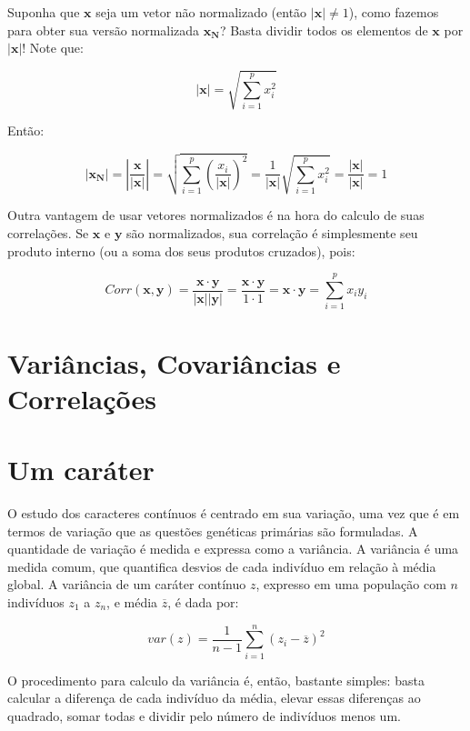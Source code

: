 \documentclass[portuges,]{tufte-handout}
\begin{document}
Suponha que $\mathbf{x}$ seja um vetor não normalizado (então
$|\mathbf{x}| \neq 1$), como fazemos para obter sua versão normalizada
$\mathbf{x_N}$? Basta dividir todos os elementos de $\mathbf{x}$ por
$|\mathbf{x}|$! Note que:

\[
|\mathbf{x}| = \sqrt{\sum_{i=1}^p x_i^2}
\]

Então:

\[
|\mathbf{x_N}| = \left| \frac{\mathbf{x}}{|\mathbf{x}|} \right| = \sqrt{\sum_{i=1}^p \left (\frac{x_i}{|\mathbf{x}|} \right )^2} = \frac{1}{|\mathbf{x}|} \sqrt{\sum_{i=1}^p x_i^2} = \frac{|\mathbf{x}|}{|\mathbf{x}|} = 1
\]

Outra vantagem de usar vetores normalizados é na hora do calculo de suas
correlações. Se $\mathbf{x}$ e $\mathbf{y}$ são normalizados, sua
correlação é simplesmente seu produto interno (ou a soma dos seus
produtos cruzados), pois:

\[
Corr(\mathbf{x}, \mathbf{y}) = \frac{ \mathbf{x} \cdot \mathbf{y} }{|\mathbf{x}||\mathbf{y}|} = \frac{ \mathbf{x} \cdot \mathbf{y} }{1 \cdot 1} =  \mathbf{x} \cdot \mathbf{y} = \sum_{i=1}^p x_iy_i
\]

\section{Variâncias, Covariâncias e
Correlações}\label{variuxe2ncias-covariuxe2ncias-e-correlauxe7uxf5es}

\section{Um caráter}\label{um-caruxe1ter}

O estudo dos caracteres contínuos é centrado em sua variação, uma vez
que é em termos de variação que as questões genéticas primárias são
formuladas. A quantidade de variação é medida e expressa como a
variância. A variância é uma medida comum, que quantifica desvios de
cada indivíduo em relação à média global. A variância de um caráter
contínuo $z$, expresso em uma população com $n$ indivíduos $z_1$ a
$z_n$, e média $\overline z$, é dada por:

\[
var(z) = \frac{1}{n-1}\sum_{i=1}^n (z_i - \overline z)^2
\]

O procedimento para calculo da variância é, então, bastante simples:
basta calcular a diferença de cada indivíduo da média, elevar essas
diferenças ao quadrado, somar todas e dividir pelo número de indivíduos
menos um.
\end{document}
